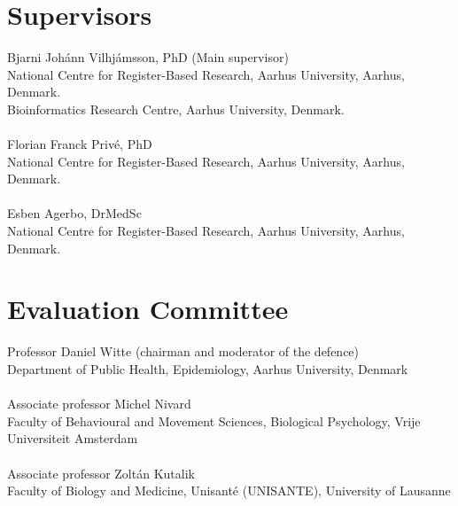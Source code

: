 \section*{Supervisors}

Bjarni Johánn Vilhjámsson, PhD (Main supervisor)\\
National Centre for Register-Based Research, Aarhus University, Aarhus, Denmark.\\
Bioinformatics Research Centre, Aarhus University, Denmark.\\
\mbox{} \\
Florian Franck Privé, PhD \\
National Centre for Register-Based Research, Aarhus University, Aarhus, Denmark.\\

\mbox{} \\
Esben Agerbo, DrMedSc\\
National Centre for Register-Based Research, Aarhus University, Aarhus, Denmark.\\


\section*{Evaluation Committee}


Professor Daniel Witte (chairman and moderator of the defence) \\
Department of Public Health, Epidemiology, Aarhus University, Denmark \\
\mbox{}\\
Associate professor Michel Nivard \\
Faculty of Behavioural and Movement Sciences, Biological Psychology, Vrije Universiteit Amsterdam \\
\mbox{}\\
Associate professor Zoltán Kutalik \\
Faculty of Biology and Medicine, Unisanté (UNISANTE), University of Lausanne\\

